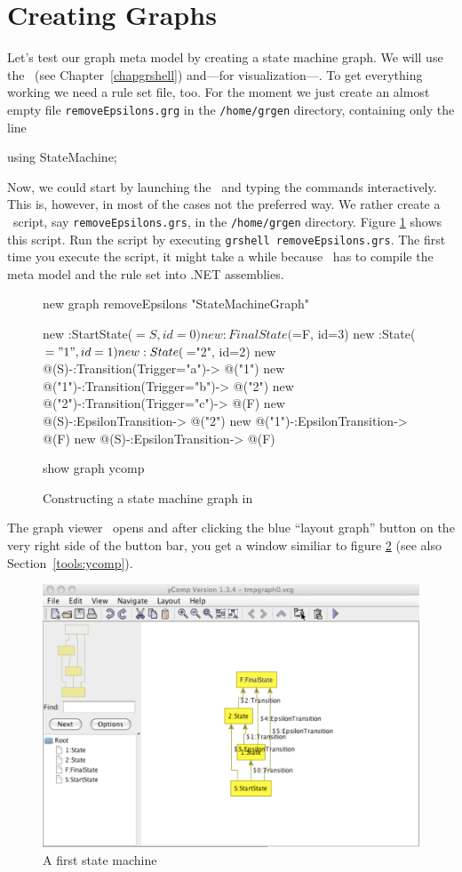 \section{Creating Graphs}
\label{sct:quick:create}
Let's test our graph meta model by creating a state machine graph.
We will use the \GrShell\ (see Chapter~\ref{chapgrshell}) and---for visualization---\yComp.
To get everything working we need a rule set file, too.
For the moment we just create an almost empty file \texttt{removeEpsilons.grg} in the \texttt{/home/grgen} directory, containing only the line
\begin{grgen}
using StateMachine;
\end{grgen}
Now, we could start by launching the \GrShell\ and typing the commands interactively.
This is, however, in most of the cases not the preferred way.
We rather create a \GrShell\ script, say \texttt{removeEpsilons.grs}, in the \texttt{/home/grgen} directory.
Figure \ref{fig:quick:shell} shows this script.
Run the script by executing \texttt{grshell removeEpsilons.grs}.
The first time you execute the script, it might take a while because \GrG\ has to compile the meta model and the rule set into .NET assemblies.
\begin{figure}[htbp]
    \centering
    \begin{grgen}
new graph removeEpsilons "StateMachineGraph"

new :StartState($=S, id=0)
new :FinalState($=F, id=3)
new :State($="1", id=1)
new :State($="2", id=2)
new @(S)-:Transition(Trigger="a")-> @("1")
new @("1")-:Transition(Trigger="b")-> @("2")
new @("2")-:Transition(Trigger="c")-> @(F)
new @(S)-:EpsilonTransition-> @("2")
new @("1")-:EpsilonTransition-> @(F)
new @(S)-:EpsilonTransition-> @(F)

show graph ycomp
    \end{grgen}
    \caption{Constructing a state machine graph in \GrShell}
    \label{fig:quick:shell}
\end{figure}
The graph viewer \yComp\ opens and after clicking the blue ``layout graph'' button on the very right side of the button bar, you get a window similiar to figure \ref{fig:quick:ycomp} (see also Section~\ref{tools:ycomp}).
\begin{figure}[htbp]
	\centering
	\includegraphics[width=0.8\linewidth]{fig/quickycomp}
	\caption{A first state machine}
	\label{fig:quick:ycomp}
\end{figure}
